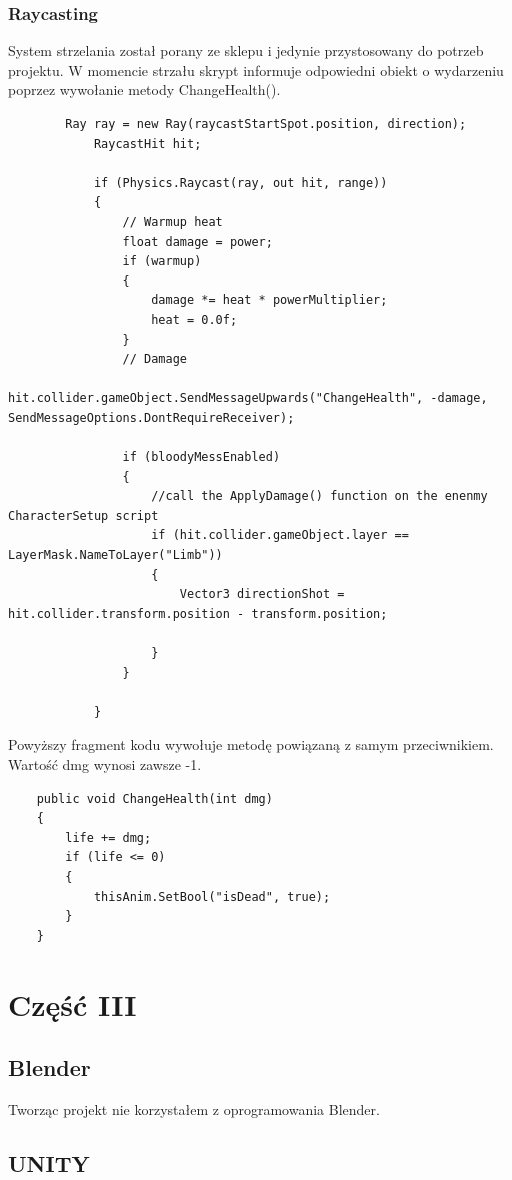 \documentclass[12pt,a4paper]{article}
\newcommand{\si}{ś}
\begin{document}
	\subsubsection*{Raycasting} 
	System strzelania został porany ze sklepu i jedynie przystosowany do potrzeb projektu. W momencie strzału skrypt informuje odpowiedni obiekt o wydarzeniu poprzez wywołanie metody ChangeHealth().
	\begin{verbatim}		
		Ray ray = new Ray(raycastStartSpot.position, direction);
            RaycastHit hit;

            if (Physics.Raycast(ray, out hit, range))
            {
                // Warmup heat
                float damage = power;
                if (warmup)
                {
                    damage *= heat * powerMultiplier;
                    heat = 0.0f;
                }
                // Damage
                hit.collider.gameObject.SendMessageUpwards("ChangeHealth", -damage, SendMessageOptions.DontRequireReceiver);

                if (bloodyMessEnabled)
                {
                    //call the ApplyDamage() function on the enenmy CharacterSetup script
                    if (hit.collider.gameObject.layer == LayerMask.NameToLayer("Limb"))
                    {
                        Vector3 directionShot = hit.collider.transform.position - transform.position;

                    }
                }

            }
	\end{verbatim}
	Powyższy fragment kodu wywołuje metodę powiązaną z samym przeciwnikiem. Warto\si ć dmg wynosi zawsze -1.
	\begin{verbatim}
	public void ChangeHealth(int dmg)
    {
        life += dmg;
        if (life <= 0)
        {
            thisAnim.SetBool("isDead", true);
        }
    }
	\end{verbatim}



	\newpage
		\section*{Część III}
		\subsection{Blender}
		Tworząc projekt nie korzystałem z oprogramowania Blender.
		\subsection{UNITY}
\end{document}
